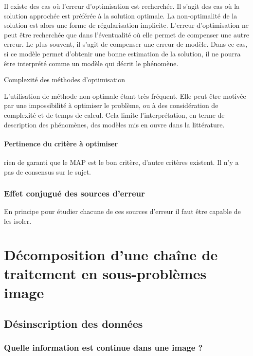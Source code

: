 \documentclass[../main/These_Mathias_Paget.tex]{subfiles}
\begin{document}
	Il existe des cas où l'erreur d'optimisation est recherchée. Il s'agit des cas où la solution approchée est préférée à la solution optimale. La non-optimalité de la solution est alors une forme de régularisation implicite. L'erreur d'optimisation ne peut être recherchée que dans l'éventualité où elle permet de compenser une autre erreur. Le plus souvent, il s'agit de compenser une erreur de modèle. Dans ce cas, si ce modèle permet d'obtenir une bonne estimation de la solution, il ne pourra être interprété comme un modèle qui décrit le phénomène.
	
	Complexité des méthodes d'optimisation
	
	L'utilisation de méthode non-optimale étant très fréquent. Elle peut être motivée par une impossibilité à optimiser le problème, ou à des considération de complexité et de temps de calcul. Cela limite l'interprétation, en terme de description des phénomènes, des modèles mis en ouvre dans la littérature.






\paragraph*{Pertinence du critère à optimiser}
rien de garanti que le MAP est le bon critère, d'autre critères existent. Il n'y a pas de consensus sur le sujet.

\subsubsection{Effet conjugué des sources d'erreur}
En principe pour étudier chacune de ces sources d'erreur il faut être capable de les isoler.


\section{Décomposition d'une chaîne de traitement en sous-problèmes image}


\subsection{Désinscription des données}

\subsubsection{Quelle information est continue dans une image ?}
\end{document}
